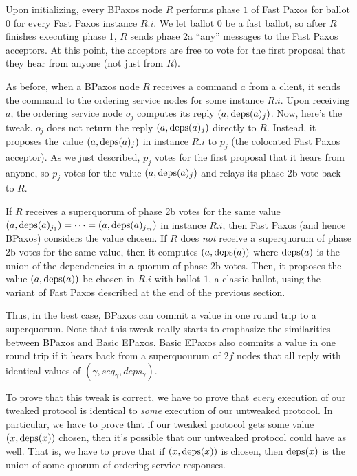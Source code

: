 \documentclass{mwhittaker}
\begin{document}
Upon initializing, every BPaxos node $R$ performs phase $1$ of Fast Paxos for
ballot $0$ for every Fast Paxos instance $R.i$. We let ballot $0$ be a fast
ballot, so after $R$ finishes executing phase 1, $R$ sends phase 2a ``any''
messages to the Fast Paxos acceptors. At this point, the acceptors are free to
vote for the first proposal that they hear from anyone (not just from $R$).

As before, when a BPaxos node $R$ receives a command $a$ from a client, it
sends the command to the ordering service nodes for some instance $R.i$.
Upon receiving $a$, the ordering service node $o_j$ computes its reply $(a,
\text{deps}(a)_j)$. Now, here's the tweak. $o_j$ does not return the reply $(a,
\text{deps}(a)_j)$ directly to $R$. Instead, it proposes the value $(a, \text{deps}(a)_j)$
in instance $R.i$ to $p_j$ (the colocated Fast Paxos acceptor). As we just
described, $p_j$ votes for the first proposal that it hears from anyone, so
$p_j$ votes for the value $(a, \text{deps}(a)_j)$ and relays its phase 2b vote back
to $R$.

If $R$ receives a superquorum of phase 2b votes for the same value $(a,
\text{deps}(a)_{j_1}) = \cdots = (a, \text{deps}(a)_{j_{m}})$ in instance $R.i$, then Fast
Paxos (and hence BPaxos) considers the value chosen. If $R$ does \emph{not}
receive a superquorum of phase 2b votes for the same value, then it computes
$(a, \text{deps}(a))$ where $\text{deps}(a)$ is the union of the dependencies in a quorum
of phase 2b votes. Then, it proposes the value $(a, \text{deps}(a))$ be chosen in
$R.i$ with ballot $1$, a classic ballot, using the variant of Fast Paxos
described at the end of the previous section.

Thus, in the best case, BPaxos can commit a value in one round trip to a
superquorum. Note that this tweak really starts to emphasize the similarities
between BPaxos and Basic EPaxos. Basic EPaxos also commits a value in one round
trip if it hears back from a superquourum of $2f$ nodes that all reply with
identical values of $(\gamma, seq_\gamma, deps_\gamma)$.

To prove that this tweak is correct, we have to prove that \emph{every}
execution of our tweaked protocol is identical to \emph{some} execution of our
untweaked protocol. In particular, we have to prove that if our tweaked
protocol gets some value $(x, \text{deps}(x))$ chosen, then it's possible that our
untweaked protocol could have as well. That is, we have to prove that if $(x,
\text{deps}(x))$ is chosen, then $\text{deps}(x)$ is the union of some quorum of ordering
service responses.
\end{document}
